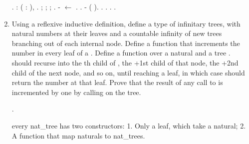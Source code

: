 \documentclass[12pt]{report}
\begin{document}
\begin{enumerate}
\begin{coqdoccode}
\coqdocemptyline
\coqdocindent{1.00em}
 .\coqdoceol
\coqdocemptyline
\coqdocindent{1.00em}
  : \coqdockw{\ensuremath{\forall}} (  : ),       .\coqdoceol
\coqdocindent{2.00em}
 ; ; ; .\coqdoceol
\coqdocindent{2.00em}
-  \ensuremath{\leftarrow}   . .\coqdoceol
\coqdocindent{2.00em}
-  (  ).    . . .\coqdoceol
\coqdocemptyline
\coqdocnoindent
{} .\coqdoceol
\coqdocemptyline
\end{coqdoccode}
\item Using a reflexive inductive definition, define a type  of infinitary trees, with natural numbers at their leaves and a countable infinity of new trees branching out of each internal node.  Define a function  that increments the number in every leaf of a .  Define a function  over a natural  and a tree .   should recurse into the th child of , the +1st child of that node, the +2nd child of the next node, and so on, until reaching a leaf, in which case  should return the number at that leaf.  Prove that the result of any call to  is incremented by one by calling  on the tree.
 \begin{coqdoccode}
\coqdocemptyline
\coqdocnoindent
{} .\coqdoceol
\end{coqdoccode}
every nat\_tree has two constructors:
1. Only a leaf, which take a natural;
2. A function that map naturals to nat\_trees.
 \begin{coqdoccode}

\end{coqdoccode}
\end{enumerate}
\end{document}
